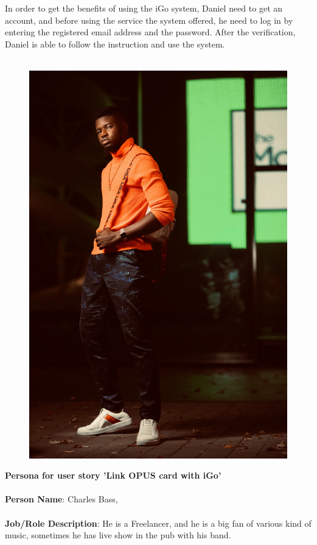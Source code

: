 \documentclass[11pt, english]{report}
\begin{document}
In order to get the benefits of using the iGo system, Daniel need to get an account, and before using the service the system offered, he need to log in by entering the registered email address and the password. After the verification, Daniel is able to follow the instruction and use the system.
\\\\
\begin{figure}
\includegraphics[width=0.9\linewidth]{images/man_Music.jpg} 
\label{fig:wrapfig}
\end{figure}
\textbf{Persona for user story 'Link OPUS card with iGo'}
\\\\
\textbf{Person Name}: Charles Bass, 
\\\\
\textbf{Job/Role Description}: He is a 
Freelancer, and he is a big fan of various kind of music, sometimes he has live show in the pub with his band.
\end{document}
